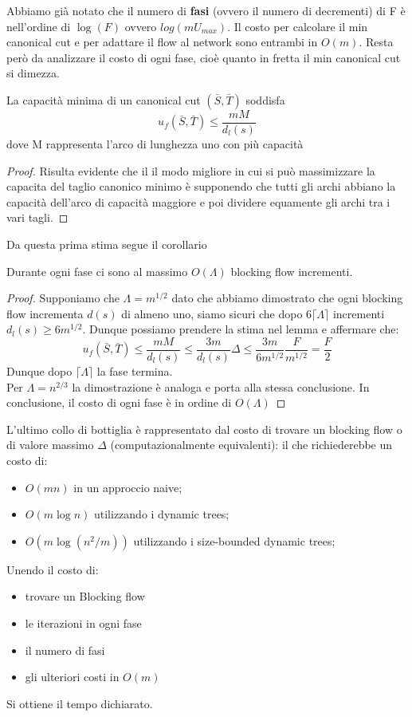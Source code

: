     Abbiamo già notato che il numero di \textbf{fasi} (ovvero il numero di decrementi) di F è nell'ordine di $\log(F)$ ovvero $log(m U_{max})$.
    Il costo per calcolare il min canonical cut e per adattare il flow al network sono entrambi in $O(m)$.
    Resta però da analizzare il costo di ogni fase, cioè quanto in fretta il min canonical cut si dimezza.
    \begin{lemma}
        {}{}
        La capacità minima di un canonical cut $(\bar{S}, \bar{T})$ soddisfa
        \[u_f(\bar{S}, \bar{T})\le \frac{mM}{d_l(s)}\]
        dove M rappresenta l'arco di lunghezza uno con più capacità
    \end{lemma}
    \begin{proof}
        Risulta evidente che il il modo migliore in cui si può massimizzare la capacita del taglio canonico minimo è supponendo che tutti gli archi abbiano la capacità dell'arco di capacità maggiore e poi dividere equamente gli archi tra i vari tagli.

    \end{proof}

    Da questa prima stima segue il corollario
    \begin{corollary}{}{}
    Durante ogni fase ci sono al massimo $O(\Lambda)$ blocking flow incrementi.
    \end{corollary}
    \begin{proof}
        Supponiamo che $\Lambda = m^{1/2}$ dato che abbiamo dimostrato che ogni blocking flow incrementa $d(s)$ di almeno uno, siamo sicuri che dopo $6\lceil \Lambda\rceil$ incrementi $d_l(s) \ge 6 m^{1/2}$.
        Dunque possiamo prendere la stima nel lemma e affermare che:
        \[ u_f(\bar{S}, \bar{T})\le \frac{mM}{d_l(s)}\le \frac{3m}{d_l(s)}\Delta\le \frac{3m}{6m^{1/2}}\frac{F}{m^{1/2}} = \frac{F}{2}\]
        Dunque dopo $\lceil \Lambda\rceil$ la fase termina.\\
        Per $\Lambda = n^{2/3}$ la dimostrazione è analoga e porta alla stessa conclusione. 
        In conclusione, il costo di ogni fase è in ordine di $O(\Lambda)$ 
    \end{proof}
    
    L'ultimo collo di bottiglia è rappresentato dal costo di trovare un blocking flow o di valore massimo $\Delta$ (computazionalmente equivalenti):
    il che richiederebbe un costo di:
    \begin{itemize}
        \item $O(mn)$ in un approccio naive;
        \item $O(m\log n)$ utilizzando i dynamic trees;
        \item $O(m \log(n^2/m))$ utilizzando i size-bounded dynamic trees;
    \end{itemize}
    Unendo il costo di:
    \begin{itemize}[label=$\times$]
        \item trovare un Blocking flow
        \item le iterazioni in ogni fase
        \item il numero di fasi
        \item gli ulteriori costi in $O(m)$
    \end{itemize}
    Si ottiene il tempo dichiarato.


\cleardoublepage